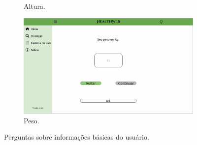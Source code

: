\begin{figure}[htbp]
\begin{subfigure}{0.49\linewidth}
		\caption{Altura.}
		\label{fig:desktop:height}
	\end{subfigure}
	\hfill
	\begin{subfigure}{0.49\linewidth}
		\centering
		\includegraphics[width=\linewidth]{figure/prototype/desktop/weight.png}
		\caption{Peso.}
		\label{fig:desktop:weight}
	\end{subfigure}
	\caption{Perguntas sobre informações básicas do usuário.}
	\label{fig:desktop:bio_sex_age_height_weight}
\end{figure}

